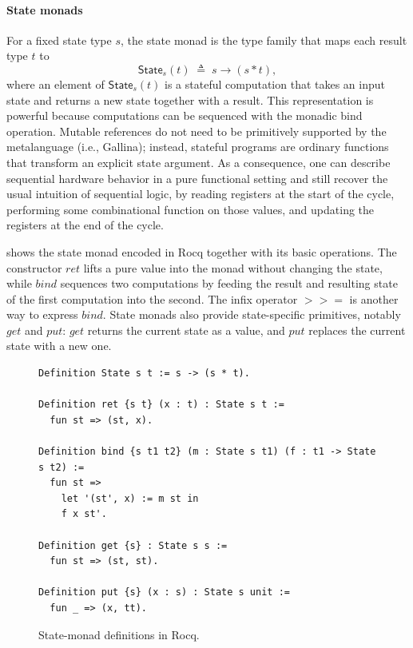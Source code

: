 \documentclass[fontset=fira-newtxsf]{mitthesis}
\theoremstyle{definition}
\theoremstyle{plain}
\begin{document}
\paragraph{State monads}
For a fixed state type $s$, the state monad is the type family that maps each result type $t$ to
\[
  \mathsf{State}_s(t) \;\triangleq\; s \to (s * t)
,\]
where an element of $\mathsf{State}_s(t)$ is a stateful computation that takes an input state and returns a new state together with a result.
This representation is powerful because computations can be sequenced with the monadic bind operation.
Mutable references do not need to be primitively supported by the metalanguage (i.e., Gallina); instead, stateful programs are ordinary functions that transform an explicit state argument.
As a consequence, one can describe sequential hardware behavior in a pure functional setting and still recover the usual intuition of sequential logic, by reading registers at the start of the cycle, performing some combinational function on those values, and updating the registers at the end of the cycle.

 shows the state monad encoded in Rocq together with its basic operations.
The constructor $\mathit{ret}$ lifts a pure value into the monad without changing the state, while $\mathit{bind}$ sequences two computations by feeding the result and resulting state of the first computation into the second.
The infix operator $\mathbin{>>=}$ is another way to express $\mathit{bind}$.
State monads also provide state-specific primitives, notably $\mathit{get}$ and $\mathit{put}$: $\mathit{get}$ returns the current state as a value, and $\mathit{put}$ replaces the current state with a new one.

\begin{figure}[H]
\begin{verbatim}
Definition State s t := s -> (s * t).

Definition ret {s t} (x : t) : State s t :=
  fun st => (st, x).

Definition bind {s t1 t2} (m : State s t1) (f : t1 -> State s t2) :=
  fun st =>
    let '(st', x) := m st in
    f x st'.

Definition get {s} : State s s :=
  fun st => (st, st).

Definition put {s} (x : s) : State s unit :=
  fun _ => (x, tt).
\end{verbatim}
\caption[State-monad definitions]{State-monad definitions in Rocq.}
\label{fig:state-monad-core}
\end{figure}
\end{document}
